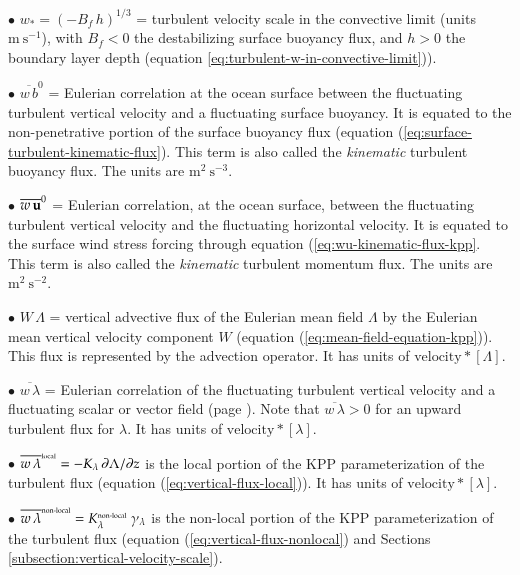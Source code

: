 \begin{trivlist}
\item[$\bullet$] $w_{*} = (-B_{f} \, h)^{1/3}$ = turbulent velocity
  scale in the convective limit (units $\mbox{m}~\mbox{s}^{-1}$), with
  $B_{f} < 0$ the destabilizing surface buoyancy flux, and $h > 0$ the
  boundary layer depth (equation
  \ref{eq:turbulent-w-in-convective-limit})).

\item[$\bullet$] $\overline{w \, b}^{0}$ = Eulerian correlation at
  the ocean surface between the fluctuating turbulent vertical
  velocity and a fluctuating surface buoyancy. It is equated to the
  non-penetrative portion of the surface buoyancy flux (equation
  (\ref{eq:surface-turbulent-kinematic-flux}).  This term is also
  called the {\it kinematic} turbulent buoyancy flux.  The units are
  $\mbox{m}^{2}~\mbox{s}^{-3}$.

\item[$\bullet$] $\overline{w \, {\bf u}}^{0}$ = Eulerian
  correlation, at the ocean surface, between the fluctuating turbulent
  vertical velocity and the fluctuating horizontal velocity. It is
  equated to the surface wind stress forcing through equation
  (\ref{eq:wu-kinematic-flux-kpp}.  This term is also called the {\it
    kinematic} turbulent momentum flux.  The units are
  $\mbox{m}^{2}~\mbox{s}^{-2}$.

\item[$\bullet$] $W \, \Lambda$ = vertical advective flux of the Eulerian mean
  field $\Lambda$ by the Eulerian mean vertical velocity component $W$
  (equation (\ref{eq:mean-field-equation-kpp})). This flux is
  represented by the advection operator.  It has units of
  $\mbox{velocity} * [\Lambda]$.

\item[$\bullet$] $\overline{w \, \lambda}$ = Eulerian correlation of the
  fluctuating turbulent vertical velocity and a fluctuating scalar or
  vector field (page \pageref{correlation_defined}).  Note that
  $\overline{w \, \lambda} > 0$ for an upward turbulent flux for
  $\lambda$.  It has units of $\mbox{velocity} * [\lambda]$.

\item[$\bullet$] $\overline{w \, \lambda}^{\mbox{\tiny local}} =
  -K_{\lambda} \, \partial \Lambda / \partial z$
  is the local portion of the KPP parameterization of the turbulent
  flux (equation (\ref{eq:vertical-flux-local})).  It has units of
  $\mbox{velocity} * [\lambda]$.

\item[$\bullet$] $\overline{w \, \lambda}^{\mbox{\tiny non-local}} =
  K^{\mbox{\tiny non-local}}_{\lambda} \; \gamma_{\lambda}$ is the
  non-local portion of the KPP parameterization of the turbulent flux
  (equation (\ref{eq:vertical-flux-nonlocal}) and Sections
  \ref{subsection:vertical-velocity-scale}).


\end{trivlist}
